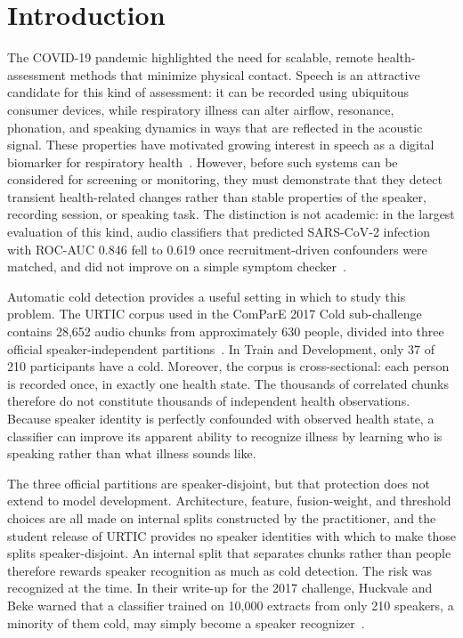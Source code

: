 \section{Introduction}
\label{sec:intro}

The COVID-19 pandemic highlighted the need for scalable, remote health-assessment methods that minimize physical contact.
Speech is an attractive candidate for this kind of assessment: it can be recorded using ubiquitous consumer devices, while respiratory illness can alter airflow, resonance, phonation, and speaking dynamics in ways that are reflected in the acoustic signal. 
These properties have motivated growing interest in speech as a digital biomarker for respiratory health~\cite{cummins2018speech}. 
However, before such systems can be considered for screening or monitoring, they must demonstrate that they detect transient health-related changes rather than stable properties of the speaker, recording session, or speaking task. 
The distinction is not academic: in the largest evaluation of this kind, audio classifiers that predicted SARS-CoV-2 infection with ROC-AUC 0.846 fell to 0.619 once recruitment-driven confounders were matched, and did not improve on a simple symptom checker~\cite{coppock2024audio}.

Automatic cold detection provides a useful setting in which to study this problem. 
The URTIC corpus used in the ComParE 2017 Cold sub-challenge contains 28,652 audio chunks from approximately 630 people, divided into three official speaker-independent partitions~\cite{schuller2017interspeech}. 
In Train and Development, only 37 of 210 participants have a cold. 
Moreover, the corpus is cross-sectional: each person is recorded once, in exactly one health state. 
The thousands of correlated chunks therefore do not constitute thousands of independent health observations. 
Because speaker identity is perfectly confounded with observed health state, a classifier can improve its apparent ability to recognize illness by learning who is speaking rather than what illness sounds like.

The three official partitions are speaker-disjoint, but that protection does not extend to model development. 
Architecture, feature, fusion-weight, and threshold choices are all made on internal splits constructed by the practitioner, and the student release of URTIC provides no speaker identities with which to make those splits speaker-disjoint. 
An internal split that separates chunks rather than people therefore rewards speaker recognition as much as cold detection. 
The risk was recognized at the time. In their write-up for the 2017 challenge, Huckvale and Beke warned that a classifier trained on 10,000 extracts from only 210 speakers, a minority of them cold, may simply become a speaker recognizer~\cite{huckvale2017cold}.

